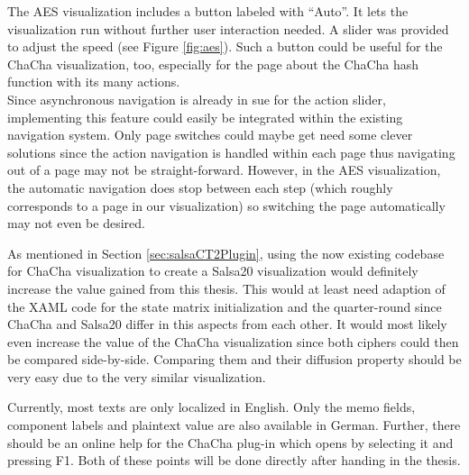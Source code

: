 \begin{description}[style=nextline]
\item[Automatic navigation]

The AES visualization includes a button labeled with ``Auto''. It lets the visualization run without further user interaction needed. A slider was provided to adjust the speed (see Figure \ref{fig:aes}). Such a button could be useful for the ChaCha visualization, too, especially for the page about the ChaCha hash function with its many actions. \\
Since asynchronous navigation is already in sue for the action slider, implementing this feature could easily be integrated within the existing navigation system. Only page switches could maybe get need some clever solutions since the action navigation is handled within each page thus navigating out of a page may not be straight-forward. However, in the AES visualization, the automatic navigation does stop between each step (which roughly corresponds to a page in our visualization) so switching the page automatically may not even be desired.

\item[Salsa20 visualization]

As mentioned in Section \ref{sec:salsaCT2Plugin}, using the now existing codebase for ChaCha visualization to create a Salsa20 visualization would definitely increase the value gained from this thesis. This would at least need adaption of the XAML code for the state matrix initialization and the quarter-round since ChaCha and Salsa20 differ in this aspects from each other. It would most likely even increase the value of the ChaCha visualization since both ciphers could then be compared side-by-side. Comparing them and their diffusion property should be very easy due to the very similar visualization.

\item[Localization and online help]

Currently, most texts are only localized in English. Only the memo fields, component labels and plaintext value are also available in German. Further, there should be an online help for the ChaCha plug-in which opens by selecting it and pressing F1. Both of these points will be done directly after handing in the thesis.

\end{description}

